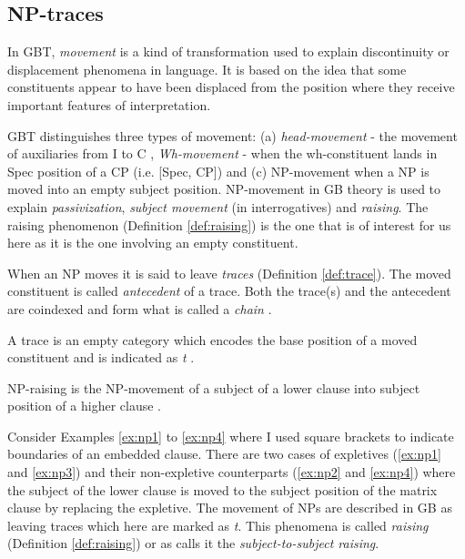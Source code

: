 \subsection{NP-traces} 
\label{sec:np-gbt}

In GBT, \textit{movement} is a kind of transformation used to explain discontinuity or displacement phenomena in language. It is based on the idea that some constituents appear to have been displaced from the position where they receive important features of interpretation. 

GBT distinguishes three types of movement: (a) \textit{head-movement} - the movement of auxiliaries from I to C , \textit{Wh-movement} - when the wh-constituent lands in Spec position of a CP (i.e. [Spec, CP]) and (c) NP-movement when a NP is moved into an empty subject position. 
NP-movement in GB theory is used to explain \textit{passivization}, \textit{subject movement} (in interrogatives) and \textit{raising}. The raising phenomenon (Definition \ref{def:raising}) is the one that is of interest for us here as it is the one involving an empty constituent. 

When an NP moves it is said to leave \textit{traces} (Definition \ref{def:trace}). The moved constituent is called \textit{antecedent} of a trace. Both the trace(s) and the antecedent are coindexed and form what is called a \textit{chain} \citep[309]{Haegeman1991}.
 

\begin{definition}[Trace]\label{def:trace}
    A trace is an empty category which encodes the base position of a moved constituent and is indicated as \textit{t} \citep[309]{Haegeman1991}. 
\end{definition}

\begin{definition}[NP-raising]\label{def:raising}
	NP-raising is the NP-movement of a subject of a lower clause into subject position of a higher clause \citep[306]{Haegeman1991}. 
\end{definition}

Consider Examples \ref{ex:np1} to \ref{ex:np4} where I used square brackets to indicate boundaries of an embedded clause. There are two cases of expletives (\ref{ex:np1} and \ref{ex:np3}) and their non-expletive counterparts (\ref{ex:np2} and \ref{ex:np4}) where the subject of the lower clause is moved to the subject position of the matrix clause by replacing the expletive. The movement of NPs are described in GB as leaving traces which here are marked as \textit{t}. This phenomena is called \textit{raising} (Definition \ref{def:raising}) or as \citet{Postal1974} calls it the \textit{subject-to-subject raising}.

